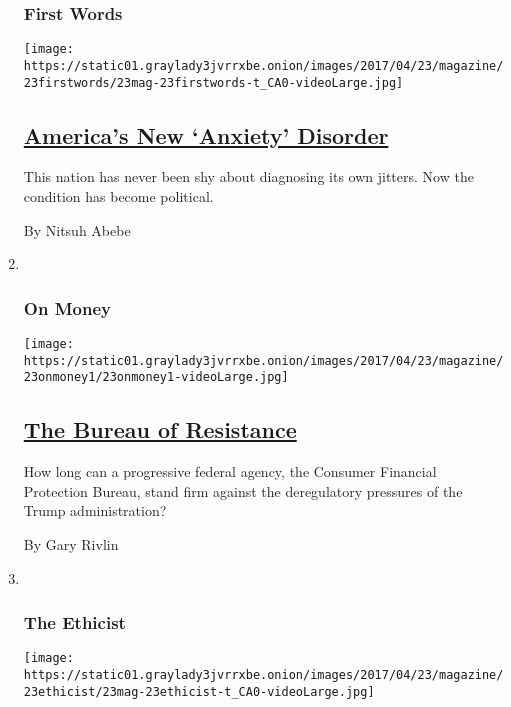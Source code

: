 \begin{enumerate}
{  \subsubsection{First Words}\label{first-words}}

  \texttt{[image: https://static01.graylady3jvrrxbe.onion/images/2017/04/23/magazine/23firstwords/23mag-23firstwords-t\_CA0-videoLarge.jpg]}

  \hypertarget{americas-new-anxiety-disorder}{%
  \subsection{\texorpdfstring{\href{/2017/04/18/magazine/americas-new-anxiety-disorder.html}{America's
  New `Anxiety'
  Disorder}}{America's New `Anxiety' Disorder}}\label{americas-new-anxiety-disorder}}

  This nation has never been shy about diagnosing its own jitters. Now
  the condition has become political.

  By Nitsuh Abebe
\item ~
  \hypertarget{on-money}{%
  \subsubsection{On Money}\label{on-money}}

  \texttt{[image: https://static01.graylady3jvrrxbe.onion/images/2017/04/23/magazine/23onmoney1/23onmoney1-videoLarge.jpg]}

  \hypertarget{the-bureau-of-resistance}{%
  \subsection{\texorpdfstring{\href{/2017/04/18/magazine/the-bureau-of-resistance.html}{The
  Bureau of
  Resistance}}{The Bureau of Resistance}}\label{the-bureau-of-resistance}}

  How long can a progressive federal agency, the Consumer Financial
  Protection Bureau, stand firm against the deregulatory pressures of
  the Trump administration?

  By Gary Rivlin
\item ~
  \hypertarget{the-ethicist}{%
  \subsubsection{The Ethicist}\label{the-ethicist}}

  \texttt{[image: https://static01.graylady3jvrrxbe.onion/images/2017/04/23/magazine/23ethicist/23mag-23ethicist-t\_CA0-videoLarge.jpg]}


\end{enumerate}
